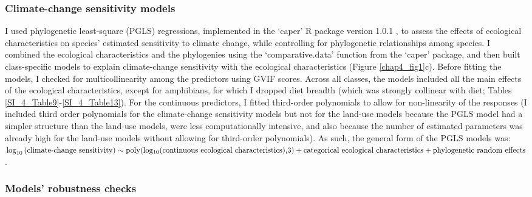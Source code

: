 \subsubsection{Climate-change sensitivity models}
I used phylogenetic least-square (PGLS) regressions, implemented in the `caper' R package version 1.0.1 \citep{caper}, to assess the effects of ecological characteristics on species' estimated sensitivity to climate change, while controlling for phylogenetic relationships among species. I combined the ecological characteristics and the phylogenies using the `comparative.data' function from the `caper' package, and then built class-specific models to explain climate-change sensitivity with the ecological characteristics (Figure \ref{chap4_fig1}c). Before fitting the models, I checked for multicollinearity among the predictors using GVIF scores. Across all classes, the models included all the main effects of the ecological characteristics, except for amphibians, for which I dropped diet breadth (which was strongly collinear with diet; Tables \ref{SI_4_Table9}-\ref{SI_4_Table13}). For the continuous predictors, I fitted third-order polynomials to allow for non-linearity of the responses (I included third order polynomials for the climate-change sensitivity models but not for the land-use models because the PGLS model had a simpler structure than the land-use models, were less computationally intensive, and also because the number of estimated parameters was already high for the land-use models without allowing for third-order polynomials). As such, the general form of the PGLS models was: 
\\
$\log_{10}\text{(climate-change sensitivity)}  \sim  \text{poly(log\textsubscript{10}(continuous ecological characteristics),3)} + \\
\text{categorical ecological characteristics} + \\
\text{phylogenetic random effects}$.


\subsubsection{Models' robustness checks}

